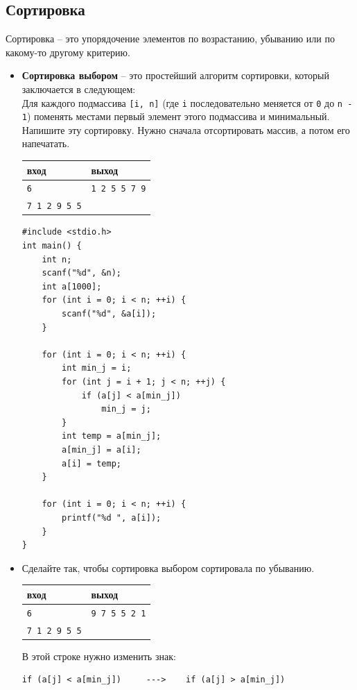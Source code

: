 \documentclass{article}
\begin{document}
\subsection*{Сортировка}
Сортировка -- это упорядочение элементов по возрастанию, убыванию или по какому-то другому критерию.
\begin{itemize}
\item \textbf{Сортировка выбором} -- это простейший алгоритм сортировки, который заключается в следующем: \\
Для каждого подмассива \texttt{[i, n]} (где \texttt{i} последовательно меняется от \texttt{0} до \texttt{n - 1}) поменять местами первый элемент этого подмассива и минимальный. Напишите эту сортировку. Нужно сначала отсортировать массив, а потом его напечатать.
\begin{center}
\begin{tabular}{ l | l }
 вход & выход \\ \hline
 \texttt{6} & \texttt{1 2 5 5 7 9}  \\ 
 \texttt{7 1 2 9 5 5} &   \\ 
\end{tabular}
\end{center}
\begin{lstlisting}[backgroundcolor = \color{solcolor}]
#include <stdio.h>
int main() {
    int n;
    scanf("%d", &n);
    int a[1000];
    for (int i = 0; i < n; ++i) {
        scanf("%d", &a[i]);
    }
    
    for (int i = 0; i < n; ++i) {
        int min_j = i;
        for (int j = i + 1; j < n; ++j) {
            if (a[j] < a[min_j])
                min_j = j;
        }
        int temp = a[min_j];
        a[min_j] = a[i];
        a[i] = temp;
    }

    for (int i = 0; i < n; ++i) {
        printf("%d ", a[i]);
    } 
}
\end{lstlisting}

\item Сделайте так, чтобы сортировка выбором сортировала по убыванию.
\begin{center}
\begin{tabular}{ l | l }
 вход & выход \\ \hline
 \texttt{6} & \texttt{9 7 5 5 2 1}  \\ 
 \texttt{7 1 2 9 5 5} &   \\ 
\end{tabular}
\end{center}

В этой строке нужно изменить знак:
\begin{lstlisting}[backgroundcolor = \color{solcolor}]
if (a[j] < a[min_j])     --->    if (a[j] > a[min_j]) 
\end{lstlisting}


\end{itemize}
\end{document}

